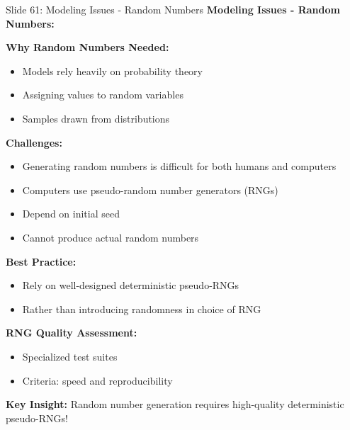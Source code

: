 \documentclass[8pt]{beamer}
\begin{document}
	\begin{frame}{Slide 61: Modeling Issues - Random Numbers}
		\fontsize{6.5}{7.5}\selectfont
		\textbf{Modeling Issues - Random Numbers:}
		
		\vspace{0.1cm}
		\textbf{Why Random Numbers Needed:}
		\begin{itemize}
			\item Models rely heavily on probability theory
			\item Assigning values to random variables
			\item Samples drawn from distributions
		\end{itemize}
		
		\vspace{0.1cm}
		\textbf{Challenges:}
		\begin{itemize}
			\item Generating random numbers is difficult for both humans and computers
			\item Computers use pseudo-random number generators (RNGs)
			\item Depend on initial seed
			\item Cannot produce actual random numbers
		\end{itemize}
		
		\vspace{0.1cm}
		\textbf{Best Practice:}
		\begin{itemize}
			\item Rely on well-designed deterministic pseudo-RNGs
			\item Rather than introducing randomness in choice of RNG
		\end{itemize}
		
		\vspace{0.1cm}
		\textbf{RNG Quality Assessment:}
		\begin{itemize}
			\item Specialized test suites
			\item Criteria: speed and reproducibility
		\end{itemize}
		
		\textcolor{myblue}{\textbf{Key Insight:}} Random number generation requires \textcolor{myblue}{high-quality deterministic pseudo-RNGs}!
	\end{frame}
	
\end{document}
